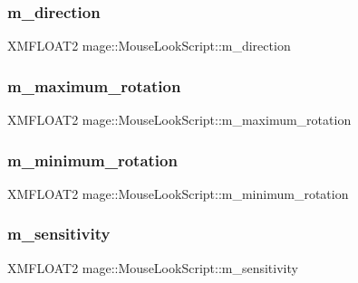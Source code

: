 \subsubsection{\texorpdfstring{m\+\_\+direction}{m\_direction}}
{\footnotesize\ttfamily X\+M\+F\+L\+O\+A\+T2 mage\+::\+Mouse\+Look\+Script\+::m\+\_\+direction\hspace{0.3cm}{\ttfamily [private]}}

\hypertarget{classmage_1_1_mouse_look_script_a0d5f2933555b76efd7cf83c7672574dd}{}\label{classmage_1_1_mouse_look_script_a0d5f2933555b76efd7cf83c7672574dd} 
\subsubsection{\texorpdfstring{m\+\_\+maximum\+\_\+rotation}{m\_maximum\_rotation}}
{\footnotesize\ttfamily X\+M\+F\+L\+O\+A\+T2 mage\+::\+Mouse\+Look\+Script\+::m\+\_\+maximum\+\_\+rotation\hspace{0.3cm}{\ttfamily [private]}}

\hypertarget{classmage_1_1_mouse_look_script_ad09bda241666f60dfc408500cafd073d}{}\label{classmage_1_1_mouse_look_script_ad09bda241666f60dfc408500cafd073d} 
\subsubsection{\texorpdfstring{m\+\_\+minimum\+\_\+rotation}{m\_minimum\_rotation}}
{\footnotesize\ttfamily X\+M\+F\+L\+O\+A\+T2 mage\+::\+Mouse\+Look\+Script\+::m\+\_\+minimum\+\_\+rotation\hspace{0.3cm}{\ttfamily [private]}}

\hypertarget{classmage_1_1_mouse_look_script_a4f38b9bd8e7271503a70753ce6a923c7}{}\label{classmage_1_1_mouse_look_script_a4f38b9bd8e7271503a70753ce6a923c7} 
\subsubsection{\texorpdfstring{m\+\_\+sensitivity}{m\_sensitivity}}
{\footnotesize\ttfamily X\+M\+F\+L\+O\+A\+T2 mage\+::\+Mouse\+Look\+Script\+::m\+\_\+sensitivity\hspace{0.3cm}{\ttfamily [private]}}

